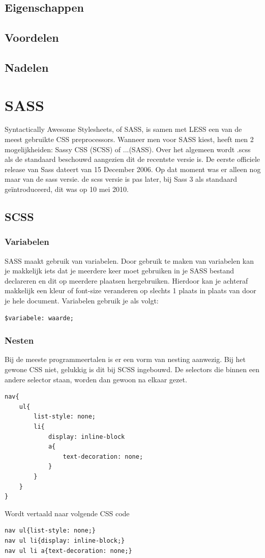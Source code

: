\documentclass[pdftex,a4paper,12pt,twoside]{report}
\begin{document}
\subsection{Eigenschappen}
\subsection{Voordelen}
\subsection{Nadelen}


\section{SASS}
Syntactically Awesome Stylesheets, of SASS, is samen met LESS een van de meest gebruikte CSS preprocessors. Wanneer men voor SASS  kiest, heeft men 2 mogelijkheiden: Sassy CSS (SCSS) of ...(SASS).\newline
Over het algemeen wordt .scss als de standaard beschouwd aangezien dit de recentste versie is. De eerste officiele release van Sass dateert van 15 December 2006. Op dat moment was er alleen nog maar van de sass versie. de scss versie is pas later, bij Sass 3 als standaard geïntroduceerd, dit was op 10 mei 2010. 
\subsection{SCSS}
\subsubsection{Variabelen}
SASS maakt gebruik van variabelen. Door gebruik te maken van variabelen kan je makkelijk iets dat je meerdere keer moet gebruiken in je SASS bestand declareren en dit op meerdere plaatsen hergebruiken. Hierdoor kan je achteraf makkelijk een kleur of font-size veranderen op slechts 1 plaats in plaats van door je hele document.\newline
Variabelen gebruik je als volgt:
\begin{lstlisting}
$variabele: waarde;
\end{lstlisting}
\subsubsection{Nesten}
Bij de meeste programmeertalen is er een vorm van nesting aanwezig. Bij het gewone CSS niet, gelukkig is dit bij SCSS ingebouwd.
De selectors die binnen een andere selector staan, worden dan gewoon na elkaar gezet.
\begin{lstlisting}
nav{
	ul{
		list-style: none;
		li{
			display: inline-block
			a{
				text-decoration: none;			
			}
		}
	}
}
\end{lstlisting}
Wordt vertaald naar volgende CSS code
\begin{lstlisting}
nav ul{list-style: none;}
nav ul li{display: inline-block;}
nav ul li a{text-decoration: none;}
\end{lstlisting}
\end{document}
